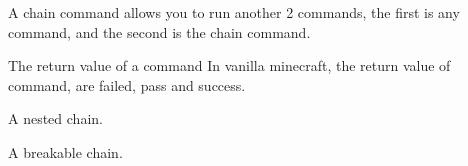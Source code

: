 
A chain command allows you to run another 2 commands, the first is any command, and the second is the chain command.

\begin{note}{The return value of a command}
    In vanilla minecraft, the return value of command, are failed, pass and success.
\end{note}



\begin{example}{A nested chain.}
\end{example}

\begin{example}{A breakable chain.}
\end{example}

